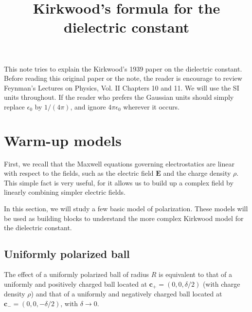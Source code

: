\documentclass[11pt]{article}
\newcommand{\vct}[1]{\boldsymbol{\mathbf{#1}}}
\newcommand{\vE}{\vct{E}}
\begin{document}
\title{Kirkwood's formula for the dielectric constant}
\author{ \vspace{-10ex} }
\date{ \vspace{-10ex} }
\maketitle


This note tries to explain the Kirkwood's 1939 paper\cite{kirkwood1939a}
on the dielectric constant.
%
Before reading this original paper or the note,
%
the reader is encourage to review Feynman's Lectures on Physics,
Vol. II Chapters 10 and 11.
%
We will use the SI units throughout.
If the reader who prefers the Gaussian units
should simply replace $\epsilon_0$ by $1/(4 \pi)$,
and ignore $4\pi \epsilon_0$ wherever it occurs.



\section{Warm-up models}



First, we recall that the Maxwell equations governing electrostatics
are linear with respect to the fields,
such as the electric field $\vE$ and the charge density $\rho$.
%
This simple fact is very useful,
for it allows us to build up a complex field
by linearly combining simpler electric fields.

In this section,
we will study a few basic model of polarization.
%
These models will be used as building blocks
to understand the more complex Kirkwood model for
the dielectric constant.



\subsection{Uniformly polarized ball}



The effect of a uniformly polarized ball of radius $R$ is equivalent to
that of a uniformly and positively charged ball
located at $\vct c_+ = (0, 0, \delta/2)$ (with charge density $\rho$)
and that of a uniformly and negatively charged ball
located at $\vct c_- = (0, 0, -\delta/2)$,
with $\delta \rightarrow 0$.
\end{document}
